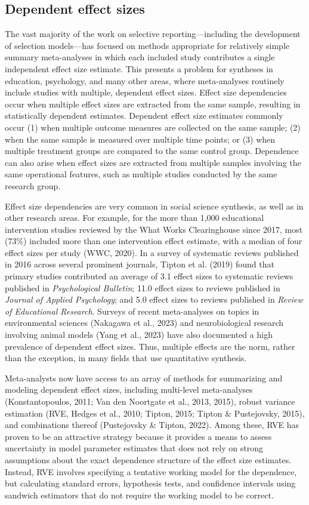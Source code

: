 \documentclass[
  man, donotrepeattitle,floatsintext]{apa7}
\begin{document}
\subsection{Dependent effect sizes}\label{dependent-effect-sizes}

The vast majority of the work on selective reporting---including the development of selection models---has focused on methods appropriate for relatively simple summary meta-analyses in which each included study contributes a single independent effect size estimate.
This presents a problem for syntheses in education, psychology, and many other areas, where meta-analyses routinely include studies with multiple, dependent effect sizes.
Effect size dependencies occur when multiple effect sizes are extracted from the same sample, resulting in statistically dependent estimates.
Dependent effect size estimates commonly occur (1) when multiple outcome measures are collected on the same sample; (2) when the same sample is measured over multiple time points; or (3) when multiple treatment groups are compared to the same control group.
Dependence can also arise when effect sizes are extracted from multiple samples involving the same operational features, such as multiple studies conducted by the same research group.

Effect size dependencies are very common in social science synthesis, as well as in other research areas.
For example, for the more than 1,000 educational intervention studies reviewed by the What Works Clearinghouse since 2017, most (73\%) included more than one intervention effect estimate, with a median of four effect sizes per study (WWC, 2020).
In a survey of systematic reviews published in 2016 across several prominent journals, Tipton et al. (2019) found that primary studies contributed an average of 3.1 effect sizes to systematic reviews published in \emph{Psychological Bulletin}; 11.0 effect sizes to reviews published in \emph{Journal of Applied Psychology}; and 5.0 effect sizes to reviews published in \emph{Review of Educational Research}.
Surveys of recent meta-analyses on topics in environmental sciences (Nakagawa et al., 2023) and neurobiological research involving animal models (Yang et al., 2023) have also documented a high prevalence of dependent effect sizes.
Thus, multiple effects are the norm, rather than the exception, in many fields that use quantitative synthesis.

Meta-analysts now have access to an array of methods for summarizing and modeling dependent effect sizes, including multi-level meta-analyses (Konstantopoulos, 2011; Van den Noortgate et al., 2013, 2015), robust variance estimation (RVE, Hedges et al., 2010; Tipton, 2015; Tipton \& Pustejovsky, 2015), and combinations thereof (Pustejovsky \& Tipton, 2022).
Among these, RVE has proven to be an attractive strategy because it provides a means to assess uncertainty in model parameter estimates that does not rely on strong assumptions about the exact dependence structure of the effect size estimates.
Instead, RVE involves specifying a tentative working model for the dependence, but calculating standard errors, hypothesis tests, and confidence intervals using sandwich estimators that do not require the working model to be correct.
\end{document}
